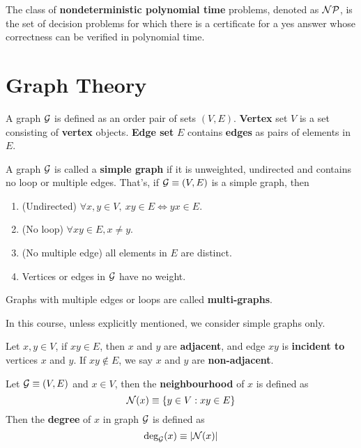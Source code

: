 \documentclass{article}
\begin{document}
			\begin{definition}
				The class of \textbf{nondeterministic polynomial time} problems, denoted as $\mathcal{{NP}}$, is the set of decision problems for which there is a certificate for a yes answer whose correctness can be verified in polynomial time.
			\end{definition}
	
	\section{Graph Theory}
		\begin{definition}
			A graph $\mathcal{{G}}$ is defined as an order pair of sets $(V, E)$. \textbf{Vertex} set $V$ is a set consisting of \textbf{vertex} objects. \textbf{Edge set} $E$ contains \textbf{edges} as pairs of elements in $E$.
		\end{definition}
		
		\begin{definition}
			A graph $\mathcal{{G}}$ is called a \textbf{simple graph} if it is unweighted, undirected and contains no loop or multiple edges. That's, if $\mathcal{{G}} \equiv (V, E)$ is a simple graph, then
			\begin{enumerate}
				\item (Undirected) $\forall x, y \in V,\ xy \in E \iff yx \in E$.
				\item (No loop) $\forall xy \in E, x \neq y$.
				\item (No multiple edge) all elements in $E$ are distinct.
				\item Vertices or edges in $\mathcal{{G}}$ have no weight.
			\end{enumerate}
			Graphs with multiple edges or loops are called \textbf{multi-graphs}.
		\end{definition}
		
		\begin{remark}
			In this course, unless explicitly mentioned, we consider simple graphs only.
		\end{remark}
		
		\begin{definition}
			Let $x, y \in V$, if $xy \in E$, then $x$ and $y$ are \textbf{adjacent}, and edge $xy$ is \textbf{incident to} vertices $x$ and $y$. If $xy \notin E$, we say $x$ and $y$ are \textbf{non-adjacent}.
		\end{definition}
		
		\begin{definition}
			Let $\mathcal{{G}} \equiv (V, E)$ and $x \in V$, then the \textbf{neighbourhood} of $x$ is defined as
			\begin{equation}
				\mathcal{{N}}(x) \equiv \{y \in V: xy \in E\}
			\end{equation}
			Then the \textbf{degree} of $x$ in graph $\mathcal{{G}}$ is defined as
			\begin{equation}
				\text{{deg}}_{\mathcal{{G}}}(x) \equiv |\mathcal{{N}}(x)|
			\end{equation}
		\end{definition}
		
\end{document}
